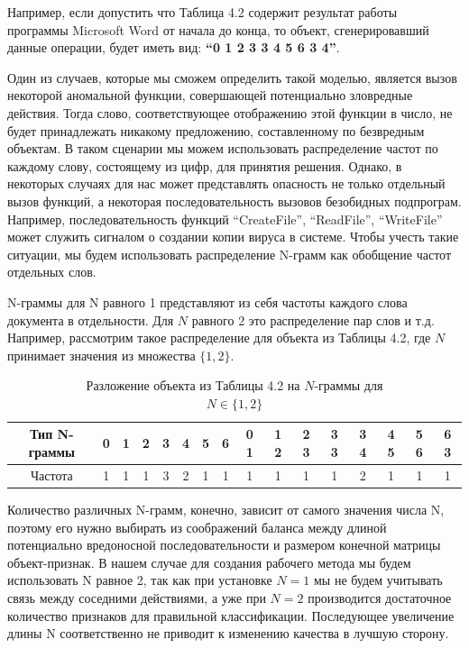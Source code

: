 Например, если допустить что Таблица 4.2 содержит результат работы программы Microsoft Word от начала до конца, то объект, сгенерировавший данные операции, будет иметь вид: \textbf{“0 1 2 3 3 4 5 6 3 4”}.

Один из случаев, которые мы сможем определить такой моделью, является вызов некоторой аномальной функции, совершающей потенциально зловредные действия. Тогда слово, соответствующее отображению этой функции в число, не будет принадлежать никакому предложению, составленному по безвредным объектам. В таком сценарии мы можем использовать распределение частот по каждому слову, состоящему из цифр, для принятия решения. Однако, в некоторых случаях для нас может представлять опасность не только отдельный вызов функций, а некоторая последовательность вызовов безобидных подпрограм. Например, последовательность функций “CreateFile”, “ReadFile”, “WriteFile” может служить сигналом о создании копии вируса в системе. Чтобы учесть такие ситуации, мы будем использовать распределение N-грамм как обобщение частот отдельных слов. 

N-граммы для N равного 1 представляют из себя частоты каждого слова документа в отдельности. Для $N$ равного 2 это распределение пар слов и т.д. Например, рассмотрим такое распределение для объекта из Таблицы 4.2, где $N$ принимает значения из множества $\{1,2\}$.

\bgroup
\def\arraystretch{1.5}%
\begin{table}[ht]
\caption{Разложение объекта из Таблицы 4.2 на $N$-граммы для \\ $N \in \{1, 2\}$}
\label{tab_weight}
\centering
    \begin{tabular}{|c|c|c|c|c|c|c|c|c|c|c|c|c|c|c|c|}
    \hline \rowcolor{lightgray!50} Тип N-граммы & 0 & 1 & 2 & 3 & 4 & 5 & 6 & 0 1 & 1 2 & 2 3 & 3 3 & 3 4 & 4 5 & 5 6 & 6 3 \\
    \hline Частота & 1 & 1 & 1 & 3 & 2 & 1 & 1 & 1 & 1 & 1 & 1 & 2 & 1 & 1 & 1 \\
    \hline
    \end{tabular}
\end{table}
\egroup

Количество различных N-грамм, конечно, зависит от самого значения числа N, поэтому его нужно выбирать из соображений баланса между длиной потенциально вредоносной последовательности и размером конечной матрицы объект-признак.
В нашем случае для создания рабочего метода мы будем использовать N равное 2, так как при установке $N = 1$ мы не будем учитывать связь между соседними действиями, а уже при $N = 2$ производится достаточное количество признаков для правильной классификации.
Последующее увеличение длины N соответственно не приводит к изменению качества в лучшую сторону.

